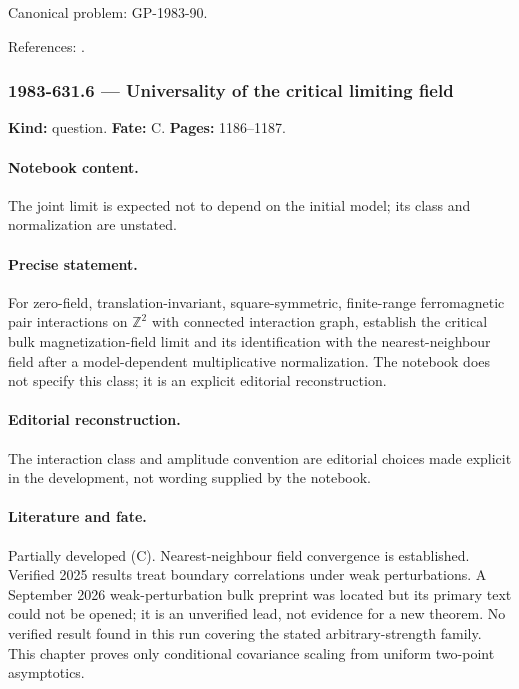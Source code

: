 \noindent Canonical problem: GP-1983-90.\par

\noindent References: \citep{camia2015magnetization}.\par

\subsubsection{1983-631.6 --- Universality of the critical limiting field}

\label{item:1983-631.6}

\noindent\textbf{Kind:} question. \textbf{Fate:} C. \textbf{Pages:} 1186--1187.\par

\paragraph{Notebook content.} The joint limit is expected not to depend on the initial model; its class and normalization are unstated.

\paragraph{Precise statement.} For zero-field, translation-invariant, square-symmetric, finite-range ferromagnetic pair interactions on \(\mathbb Z^2\) with connected interaction graph, establish the critical bulk magnetization-field limit and its identification with the nearest-neighbour field after a model-dependent multiplicative normalization. The notebook does not specify this class; it is an explicit editorial reconstruction.

\paragraph{Editorial reconstruction.} The interaction class and amplitude convention are editorial choices made explicit in the development, not wording supplied by the notebook.

\paragraph{Literature and fate.} Partially developed (C). Nearest-neighbour field convergence is established. Verified 2025 results treat boundary correlations under weak perturbations. A September 2026 weak-perturbation bulk preprint was located but its primary text could not be opened; it is an unverified lead, not evidence for a new theorem. No verified result found in this run covering the stated arbitrary-strength family. This chapter proves only conditional covariance scaling from uniform two-point asymptotics.

